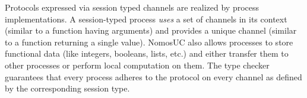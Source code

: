 Protocols expressed via session typed channels are realized by process implementations.
A session-typed process \emph{uses} a set of channels in its context (similar to a function
having arguments) and provides a unique channel (similar to a function returning a single value).
NomosUC also allows processes to store functional data (like integers, booleans, lists, etc.)
and either transfer them to other processes or perform local computation on them.
The type checker guarantees that every process adheres to the protocol on every channel as defined by
the corresponding session type.




